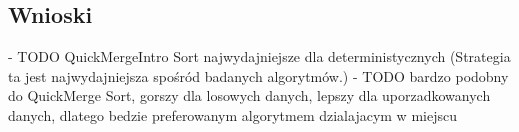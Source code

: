 \begin{figure}[]
	\centering
	
	\caption[]{}
	\label{fig:quick-merge-intro-sort-nondeterministic-pivot-random-sorted}
\end{figure}

\begin{figure}[]
	\centering
	
	\caption[]{}
	\label{fig:quick-merge-intro-sort-nondeterministic-pivot-density}
\end{figure}

\begin{figure}[]
	\centering
	
	\caption[]{}
	\label{fig:quick-merge-intro-sort-nondeterministic-pivot-density-sorted}
\end{figure}

\subsection{Wnioski}
- TODO QuickMergeIntro Sort najwydajniejsze dla deterministycznych (Strategia ta jest najwydajniejsza spośród badanych algorytmów.)
- TODO bardzo podobny do QuickMerge Sort, gorszy dla losowych danych, lepszy dla uporzadkowanych danych, dlatego bedzie preferowanym algorytmem dzialajacym w miejscu